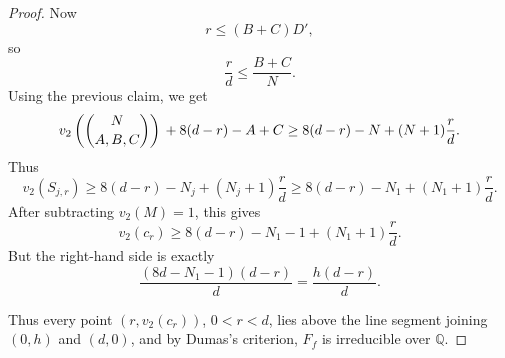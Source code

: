 \documentclass[12pt]{amsart}
\begin{document}
\begin{proof}
Now
\[
r\le (B+C)D',
\]
so
\[
\frac{r}{d}\le \frac{B+C}{N}.
\]
Using the previous claim, we get
\[
v_2\left(\binom{N}{A,B,C}\right)\textsc{}+8(d-r)-A+C
\ge
8(d-r)-N+(N+1)\frac{r}{d}.
\]
Thus
\[
v_2(S_{j,r})\ge
8(d-r)-N_j+(N_j+1)\frac{r}{d}
\ge 8(d-r)-N_1+(N_1+1)\frac{r}{d}.
\]
After subtracting $v_2(M)=1$, this gives
\[
v_2(c_r)\ge
8(d-r)-N_1-1+(N_1+1)\frac{r}{d}.
\]
But the right-hand side is exactly
\[
\frac{(8d-N_1-1)(d-r)}{d}
=
\frac{h(d-r)}{d}.
\]

Thus every point $(r,v_2(c_r))$, $0<r<d$, lies above the line segment
joining $(0,h)$ and $(d,0)$, and by Dumas's criterion, $F_f$ is irreducible over $\mathbb Q$.
\end{proof}




\end{document}
